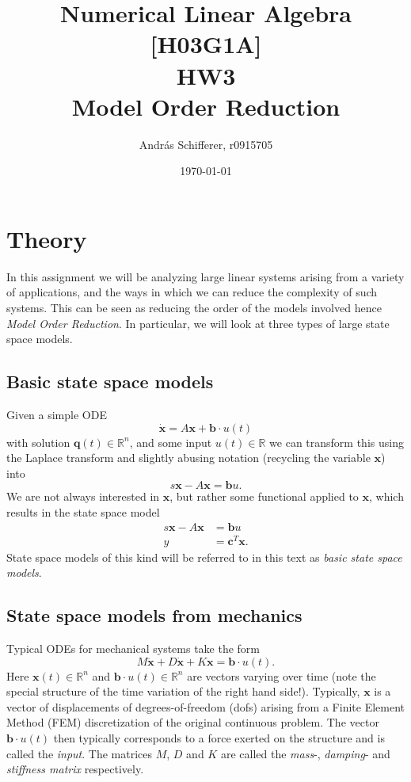 \documentclass{article}
\author{Andr\'as Schifferer, r0915705}
\title{Numerical Linear Algebra [H03G1A]\\{\LARGE HW3}\\{\large Model Order Reduction}}
\date{\today}
\begin{document}
	\maketitle
	\tableofcontents
	
	\section{Theory}
	In this assignment we will be analyzing large linear systems arising from a variety of applications, and the ways in which we can reduce the complexity of such systems. This can be seen as reducing the order of the models involved hence \emph{Model Order Reduction}. In particular, we will look at three types of large state space models.
	\subsection{Basic state space models}
	Given a simple ODE
	\begin{equation}\label{eq:eqFirstOrder}
		\dot{\mathbf{x}}=A\mathbf{x}+\mathbf{b}\cdot u(t)
	\end{equation}
	with solution $\mathbf{q}(t)\in \mathbb{R}^n$, and some input $u(t)\in\mathbb{R}$ we can transform this using the Laplace transform and slightly abusing notation (recycling the variable $\mathbf{x}$) into
	$$s\mathbf{x}-A\mathbf{x}=\mathbf{b}u.$$
	We are not always interested in $\mathbf{x}$, but rather some functional applied to $\mathbf{x}$, which results in the state space model
	\begin{equation}\label{eq:stateSpace}
		\begin{aligned}
			s\mathbf{x}-A\mathbf{x}&=\mathbf{b}u\\
			y&=\mathbf{c}^T\mathbf{x}.
		\end{aligned} 
	\end{equation}
	State space models of this kind will be referred to in this text as \emph{basic state space models}.
	
	
	\subsection{State space models from mechanics}
	Typical ODEs for mechanical systems take the form
	\begin{equation}\label{eq:SecondOrder}
		M\ddot{\mathbf{x}}+D\dot{\mathbf{x}}+K\mathbf{x}=\mathbf{b} \cdot u(t).
	\end{equation}
	Here $\mathbf{x}(t)\in\mathbb{R}^n$ and $\mathbf{b}\cdot u(t)\in\mathbb{R}^{n}$ are vectors varying over time (note the special structure of the time variation of the right hand side!). Typically, $\mathbf{x}$ is a vector of displacements of degrees-of-freedom (dofs) arising from a Finite Element Method (FEM) discretization of the original continuous problem. The vector $\mathbf{b} \cdot u(t)$ then typically corresponds to a force exerted on the structure and is called the \emph{input}. The matrices $M$, $D$ and $K$ are called the \emph{mass}-, \emph{damping}- and \emph{stiffness matrix} respectively.
	
\end{document}
